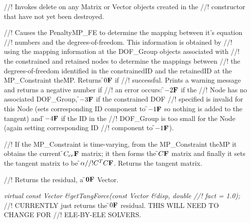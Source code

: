 //! Invokes delete on any Matrix or Vector objects created in the
//! constructor that have not yet been destroyed.

//! Causes the PenaltyMP\_FE to determine the mapping between it's equation
//! numbers and the degrees-of-freedom. This information is obtained by
//! using the mapping information at the DOF\_Group objects associated with
//! the constrained and retained nodes to determine the mappings between
//! the degrees-of-freedom identified in the \p constrainedID and the
\p retainedID at the MP\_Constraint \p theMP. Returns \f$0{\bf F}$ if
//! successful. Prints a warning message and returns a negative number if
//! an error occurs: \f$-2{\bf F}$ if the
//! Node has no associated DOF\_Group, \f$-3{\bf F}$ if the constrained DOF
//! specified is invalid for this Node (sets corresponding ID component to
\f$-1{\bf F}$ so nothing is added to the tangent) and \f$-4{\bf F}$ if the ID in the
//! DOF\_Group is too small for the Node (again setting corresponding ID
//! component to \f$-1{\bf F}$). 


//! If the MP\_Constraint is time-varying, from the MP\_Constraint
\p theMP it obtains the current \f$C_{cr}{\bf F}$ matrix; it then forms the
\f$C{\bf F}$ matrix and finally it sets the tangent matrix to be \f$\alpha
//! C^TC{\bf F}$. Returns the tangent matrix.

//! Returns the residual, a \f${\bf 0}{\bf F}$ Vector.

{\em virtual const Vector \&getTangForce(const Vector \&disp, double
//! fact = 1.0);    }
//! CURRENTLY just returns the \f$0{\bf F}$ residual. THIS WILL NEED TO CHANGE FOR
//! ELE-BY-ELE SOLVERS. 

